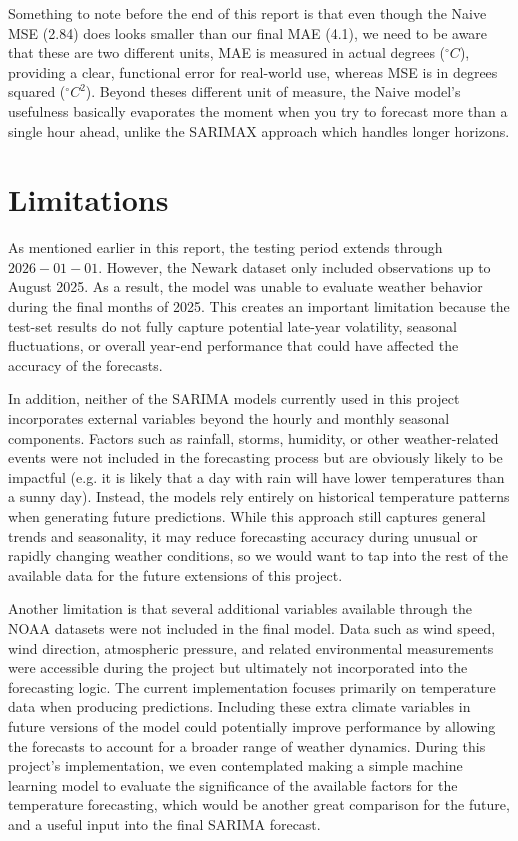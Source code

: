 \documentclass{article}
\begin{document}
Something to note before the end of this report is that even though the Naive MSE (2.84) does looks smaller than our final MAE (4.1), we need to be aware that these are two different units, MAE is measured in actual degrees ($^{\circ}C$), providing a clear, functional error for real-world use, whereas MSE is in degrees squared ($^{\circ}C^2$). Beyond theses different unit of measure, the Naive model’s usefulness basically evaporates the moment when you try to forecast more than a single hour ahead, unlike the SARIMAX approach which handles longer horizons.
    
\section{Limitations}
As mentioned earlier in this report, the testing period extends through $2026-01-01$. However, the Newark dataset only included observations up to August 2025. As a result, the model was unable to evaluate weather behavior during the final months of 2025. This creates an important limitation because the test-set results do not fully capture potential late-year volatility, seasonal fluctuations, or overall year-end performance that could have affected the accuracy of the forecasts.

In addition, neither of the SARIMA models currently used in this project incorporates external variables beyond the hourly and monthly seasonal components. Factors such as rainfall, storms, humidity, or other weather-related events were not included in the forecasting process but are obviously likely to be impactful (e.g. it is likely that a day with rain will have lower temperatures than a sunny day). Instead, the models rely entirely on historical temperature patterns when generating future predictions. While this approach still captures general trends and seasonality, it may reduce forecasting accuracy during unusual or rapidly changing weather conditions, so we would want to tap into the rest of the available data for the future extensions of this project.

Another limitation is that several additional variables available through the NOAA datasets were not included in the final model. Data such as wind speed, wind direction, atmospheric pressure, and related environmental measurements were accessible during the project but ultimately not incorporated into the forecasting logic. The current implementation focuses primarily on temperature data when producing predictions. Including these extra climate variables in future versions of the model could potentially improve performance by allowing the forecasts to account for a broader range of weather dynamics. During this project's implementation, we even contemplated making a simple machine learning model to evaluate the significance of the available factors for the temperature forecasting, which would be another great comparison for the future, and a useful input into the final SARIMA forecast.
\end{document}
